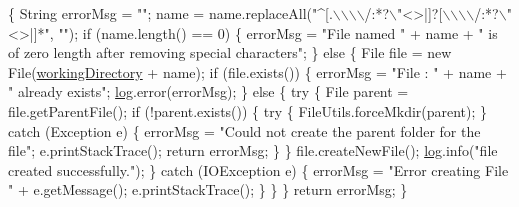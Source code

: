 \begin{DoxyCode}
                                                 \{
        String errorMsg = \textcolor{stringliteral}{""};
        name = name.replaceAll(\textcolor{stringliteral}{"^[.\(\backslash\)\(\backslash\)\(\backslash\)\(\backslash\)/:*?\(\backslash\)"<>|]?[\(\backslash\)\(\backslash\)\(\backslash\)\(\backslash\)/:*?\(\backslash\)"<>|]*"}, \textcolor{stringliteral}{""});
        \textcolor{keywordflow}{if} (name.length() == 0) \{
            errorMsg = \textcolor{stringliteral}{"File named "} + name
                    + \textcolor{stringliteral}{" is of zero length after removing special characters"};
        \} \textcolor{keywordflow}{else} \{
            File file = \textcolor{keyword}{new} File(\hyperlink{classcom_1_1poly_1_1nlp_1_1filekommander_1_1file_1_1actions_1_1_file_action_utils_ad54a8fdc9145d2f423c54cb1597f874a}{workingDirectory} + name);
            \textcolor{keywordflow}{if} (file.exists()) \{
                errorMsg = \textcolor{stringliteral}{"File : "} + name + \textcolor{stringliteral}{" already exists"};
                \hyperlink{classcom_1_1poly_1_1nlp_1_1filekommander_1_1file_1_1actions_1_1_file_action_utils_a7af6d26171248a2e7253d9bce1b287cc}{log}.error(errorMsg);
            \} \textcolor{keywordflow}{else} \{
                \textcolor{keywordflow}{try} \{
                    File parent = file.getParentFile();
                    \textcolor{keywordflow}{if} (!parent.exists()) \{
                        \textcolor{keywordflow}{try} \{
                            FileUtils.forceMkdir(parent);
                        \} \textcolor{keywordflow}{catch} (Exception e) \{
                            errorMsg = \textcolor{stringliteral}{"Could not create the parent folder for
       the file"};
                            e.printStackTrace();
                            \textcolor{keywordflow}{return} errorMsg;
                        \}
                    \}
                    file.createNewFile();
                    \hyperlink{classcom_1_1poly_1_1nlp_1_1filekommander_1_1file_1_1actions_1_1_file_action_utils_a7af6d26171248a2e7253d9bce1b287cc}{log}.info(\textcolor{stringliteral}{"file created successfully."});
                \} \textcolor{keywordflow}{catch} (IOException e) \{
                    errorMsg = \textcolor{stringliteral}{"Error creating File "} + e.getMessage();
                    e.printStackTrace();
                \}
            \}
        \}
        \textcolor{keywordflow}{return} errorMsg;
    \}
\end{DoxyCode}

